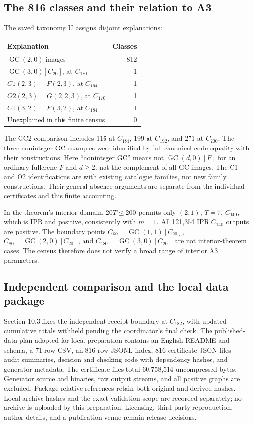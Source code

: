 \documentclass[11pt]{amsart}
\newcommand{\GC}{\operatorname{GC}}
\begin{document}
\subsection{The 816 classes and their relation to A3}
The saved taxonomy U assigns disjoint explanations:
\begin{center}\small
\begin{tabular}{lr}\toprule
Explanation & Classes\\\midrule
$\GC(2,0)$ images &812\\
$\GC(3,0)[C_{20}]$, at $C_{180}$ &1\\
$C1(2,3)=F(2,3)$, at $C_{164}$ &1\\
$O2(2,3)=G(2,2,3)$, at $C_{170}$ &1\\
$C1(3,2)=F(3,2)$, at $C_{184}$ &1\\
Unexplained in this finite census &0\\\bottomrule
\end{tabular}\end{center}
The GC2 comparison includes 116 at $C_{184}$, 199 at $C_{192}$, and
271 at $C_{200}$. The three noninteger-GC examples were identified by
full canonical-code equality with their constructions. Here
``noninteger GC'' means not $\GC(d,0)[F]$ for an ordinary fullerene
$F$ and $d\ge2$, not the complement of all GC images. The C1 and O2
identifications are with existing catalogue families, not new family
constructions. Their general absence arguments are separate from the
individual certificates and this finite accounting.

In the theorem's interior domain, $20T\le200$ permits only $(2,1)$,
$T=7$, $C_{140}$, which is IPR and positive, consistently with $m=1$.
All 121,354 IPR $C_{140}$ outputs are positive. The boundary points
$C_{60}=\GC(1,1)[C_{20}]$, $C_{80}=\GC(2,0)[C_{20}]$, and
$C_{180}=\GC(3,0)[C_{20}]$ are not interior-theorem cases. The census
therefore does not verify a broad range of interior A3 parameters.

\subsection{Independent comparison and the local data package}
Section 10.3 fixes the independent receipt boundary at $C_{182}$,
with updated cumulative totals withheld pending the coordinator's
final check. The published-data plan adopted for local preparation
contains an English README and schema, a 71-row CSV, an 816-row JSONL
index, 816 certificate JSON files, audit summaries, decision and
checking code with dependency hashes, and generator metadata.
The certificate files total 60,758,514 uncompressed bytes. Generator
source and binaries, raw output streams, and all positive graphs are
excluded. Package-relative references retain both original and derived
hashes. Local archive hashes and the exact validation scope are recorded
separately; no archive is uploaded by this preparation. Licensing,
third-party reproduction, author details, and a publication venue remain
release decisions.
\end{document}
